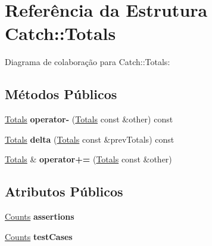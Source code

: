 \hypertarget{structCatch_1_1Totals}{}\section{Referência da Estrutura Catch\+:\+:Totals}
\label{structCatch_1_1Totals}


Diagrama de colaboração para Catch\+:\+:Totals\+:
\subsection*{Métodos Públicos}
\begin{DoxyCompactItemize}
\item 
\hyperlink{structCatch_1_1Totals}{Totals} {\bfseries operator-\/} (\hyperlink{structCatch_1_1Totals}{Totals} const \&other) const \hypertarget{structCatch_1_1Totals_abe15cd8a82ba9a4868dd7a542add827c}{}\label{structCatch_1_1Totals_abe15cd8a82ba9a4868dd7a542add827c}

\item 
\hyperlink{structCatch_1_1Totals}{Totals} {\bfseries delta} (\hyperlink{structCatch_1_1Totals}{Totals} const \&prev\+Totals) const \hypertarget{structCatch_1_1Totals_a3dee0f599c081a8360c0112fb1dafe8f}{}\label{structCatch_1_1Totals_a3dee0f599c081a8360c0112fb1dafe8f}

\item 
\hyperlink{structCatch_1_1Totals}{Totals} \& {\bfseries operator+=} (\hyperlink{structCatch_1_1Totals}{Totals} const \&other)\hypertarget{structCatch_1_1Totals_a574015076e54cc405c70b053e3356e43}{}\label{structCatch_1_1Totals_a574015076e54cc405c70b053e3356e43}

\end{DoxyCompactItemize}
\subsection*{Atributos Públicos}
\begin{DoxyCompactItemize}
\item 
\hyperlink{structCatch_1_1Counts}{Counts} {\bfseries assertions}\hypertarget{structCatch_1_1Totals_a885ded66df752147b30c3d45aa602ec9}{}\label{structCatch_1_1Totals_a885ded66df752147b30c3d45aa602ec9}

\item 
\hyperlink{structCatch_1_1Counts}{Counts} {\bfseries test\+Cases}\hypertarget{structCatch_1_1Totals_adb195fe477aedee2ecea88c888f16506}{}\label{structCatch_1_1Totals_adb195fe477aedee2ecea88c888f16506}

\end{DoxyCompactItemize}


